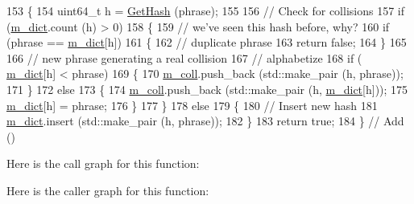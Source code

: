 \begin{DoxyCode}
153   \{
154     uint64\_t h = \hyperlink{classns3_1_1Hash_1_1Example_1_1Collider_a785988b20d366aee65f5f5b35ce5624a}{GetHash} (phrase);
155     
156     \textcolor{comment}{// Check for collisions}
157     \textcolor{keywordflow}{if} (\hyperlink{classns3_1_1Hash_1_1Example_1_1Collider_aeb8e300bae7fd86e48749e83cda290ef}{m\_dict}.count (h) > 0)
158       \{
159         \textcolor{comment}{// we've seen this hash before, why?}
160         \textcolor{keywordflow}{if} (phrase == \hyperlink{classns3_1_1Hash_1_1Example_1_1Collider_aeb8e300bae7fd86e48749e83cda290ef}{m\_dict}[h])
161           \{
162             \textcolor{comment}{// duplicate phrase}
163             \textcolor{keywordflow}{return} \textcolor{keyword}{false};
164           \}
165 
166         \textcolor{comment}{// new phrase generating a real collision}
167         \textcolor{comment}{// alphabetize}
168         \textcolor{keywordflow}{if} ( \hyperlink{classns3_1_1Hash_1_1Example_1_1Collider_aeb8e300bae7fd86e48749e83cda290ef}{m\_dict}[h] < phrase)
169           \{       
170             \hyperlink{classns3_1_1Hash_1_1Example_1_1Collider_a7076954f471121480c71827a60e69af9}{m\_coll}.push\_back (std::make\_pair (h, phrase));
171           \}
172         \textcolor{keywordflow}{else}
173           \{
174             \hyperlink{classns3_1_1Hash_1_1Example_1_1Collider_a7076954f471121480c71827a60e69af9}{m\_coll}.push\_back (std::make\_pair (h, \hyperlink{classns3_1_1Hash_1_1Example_1_1Collider_aeb8e300bae7fd86e48749e83cda290ef}{m\_dict}[h]));
175             \hyperlink{classns3_1_1Hash_1_1Example_1_1Collider_aeb8e300bae7fd86e48749e83cda290ef}{m\_dict}[h] = phrase;
176           \}            
177       \}
178     \textcolor{keywordflow}{else}
179       \{
180         \textcolor{comment}{// Insert new hash}
181         \hyperlink{classns3_1_1Hash_1_1Example_1_1Collider_aeb8e300bae7fd86e48749e83cda290ef}{m\_dict}.insert (std::make\_pair (h, phrase));
182       \}
183     \textcolor{keywordflow}{return} \textcolor{keyword}{true};
184   \}  \textcolor{comment}{// Add ()}
\end{DoxyCode}


Here is the call graph for this function\+:




Here is the caller graph for this function\+:


